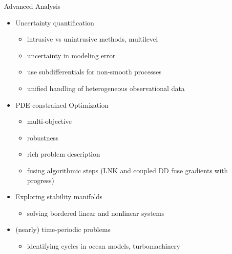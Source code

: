 \documentclass{beamer}
\begin{document}
\begin{frame}{Advanced Analysis}
  \begin{itemize}
  \item Uncertainty quantification
    \begin{itemize}
    \item intrusive vs unintrusive methods, multilevel
    \item uncertainty in modeling error
    \item use subdifferentials for non-smooth processes
    \item unified handling of heterogeneous observational data
    \end{itemize}
  \item PDE-constrained Optimization
    \begin{itemize}
    \item multi-objective
    \item robustness
    \item rich problem description
    \item fusing algorithmic steps (LNK and coupled DD fuse gradients with progress)
    \end{itemize}
  \item Exploring stability manifolds
    \begin{itemize}
    \item solving bordered linear and nonlinear systems
    \end{itemize}
  \item (nearly) time-periodic problems
    \begin{itemize}
    \item identifying cycles in ocean models, turbomachinery
    \end{itemize}
  \end{itemize}
\end{frame}
\end{document}
